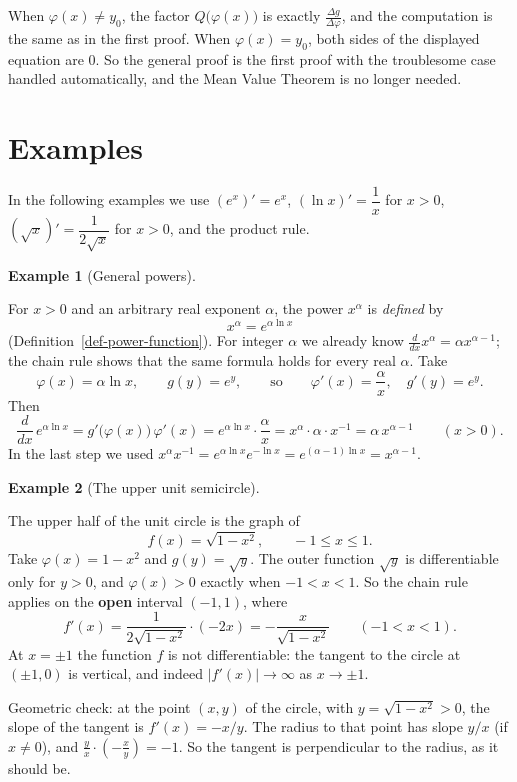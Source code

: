 \documentclass[
  letterpaper,
  DIV=11,
  numbers=noendperiod]{scrreprt}
\theoremstyle{plain}
\theoremstyle{plain}
\theoremstyle{definition}
\theoremstyle{definition}
\theoremstyle{definition}
\newtheorem{example}{Example}[chapter]
\theoremstyle{plain}
\theoremstyle{plain}
\theoremstyle{remark}
\begin{document}
When \(\varphi(x)\neq y_0\), the factor \(Q\big(\varphi(x)\big)\) is
exactly \(\frac{\Delta g}{\Delta\varphi}\), and the computation is the
same as in the first proof. When \(\varphi(x)=y_0\), both sides of the
displayed equation are \(0\). So the general proof is the first proof
with the troublesome case handled automatically, and the Mean Value
Theorem is no longer needed.

\section{Examples}\label{examples-2}

In the following examples we use \((e^x)'=e^x\), \((\ln x)'=\dfrac1x\)
for \(x>0\), \((\sqrt{x})' = \dfrac{1}{2\sqrt{x}}\) for \(x>0\), and the
product rule.

\begin{example}[General
powers]\protect\hypertarget{exm-chain-general-power}{}\label{exm-chain-general-power}

\hfill\break
For \(x>0\) and an arbitrary real exponent \(\alpha\), the power
\(x^\alpha\) is \emph{defined} by \[
x^\alpha = e^{\alpha\ln x}
\] (Definition~\ref{def-power-function}). For integer \(\alpha\) we
already know \(\frac{d}{dx}x^\alpha = \alpha x^{\alpha-1}\); the chain
rule shows that the same formula holds for every real \(\alpha\). Take
\[
\varphi(x) = \alpha\ln x, \qquad g(y) = e^y, \qquad\text{so}\qquad
\varphi'(x) = \frac{\alpha}{x},\quad g'(y) = e^y .
\] Then \[
\frac{d}{dx}\,e^{\alpha\ln x} = g'\big(\varphi(x)\big)\,\varphi'(x)
= e^{\alpha\ln x}\cdot\frac{\alpha}{x} = x^\alpha\cdot\alpha\cdot x^{-1} = \alpha\,x^{\alpha-1}
\qquad (x>0).
\] In the last step we used
\(x^\alpha x^{-1} = e^{\alpha\ln x}e^{-\ln x} = e^{(\alpha-1)\ln x}=x^{\alpha-1}\).

\end{example}

\begin{example}[The upper unit
semicircle]\protect\hypertarget{exm-chain-semicircle}{}\label{exm-chain-semicircle}

\hfill\break
The upper half of the unit circle is the graph of \[
f(x) = \sqrt{1-x^2}, \qquad -1\le x\le 1 .
\] Take \(\varphi(x) = 1-x^2\) and \(g(y) = \sqrt{y}\). The outer
function \(\sqrt{y}\) is differentiable only for \(y>0\), and
\(\varphi(x)>0\) exactly when \(-1<x<1\). So the chain rule applies on
the \textbf{open} interval \((-1,1)\), where \[
f'(x) = \frac{1}{2\sqrt{1-x^2}}\cdot(-2x) = -\frac{x}{\sqrt{1-x^2}} \qquad (-1<x<1).
\] At \(x=\pm1\) the function \(f\) is not differentiable: the tangent
to the circle at \((\pm1,0)\) is vertical, and indeed
\(\lvert f'(x) \rvert\to\infty\) as \(x\to\pm1\).

Geometric check: at the point \((x,y)\) of the circle, with
\(y = \sqrt{1-x^2}>0\), the slope of the tangent is \(f'(x) = -x/y\).
The radius to that point has slope \(y/x\) (if \(x\neq0\)), and
\(\frac{y}{x}\cdot\left(-\frac{x}{y}\right) = -1\). So the tangent is
perpendicular to the radius, as it should be.

\end{example}
\end{document}
